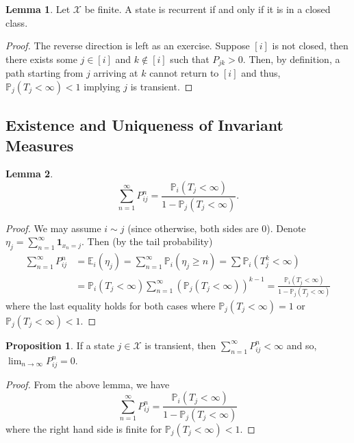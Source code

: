 \documentclass[]{article}
\theoremstyle{definition}
\theoremstyle{definition}
\newtheorem{lemma}{Lemma}[section]
\newtheorem{proposition}{Proposition}[section]
\begin{document}
\begin{lemma}
  Let \(\mathcal{X}\) be finite. A state is recurrent if and only if it is in a closed 
  class.
\end{lemma}
\begin{proof}
  The reverse direction is left as an exercise. Suppose \([i]\) is not closed, 
  then there exists some \(j \in [i]\) and \(k \not\in [i]\) such that \(P_{jk} > 0\).
  Then, by definition, a path starting from \(j\) arriving at \(k\) cannot return 
  to \([i]\) and thus, \(\mathbb{P}_j(T_j < \infty) < 1\) implying \(j\) is transient.
\end{proof}

\subsection{Existence and Uniqueness of Invariant Measures}

\begin{lemma}
  \[\sum_{n = 1}^\infty P^n_{ij} = \frac{\mathbb{P}_i(T_j < \infty)}{1 - \mathbb{P}_j(T_j < \infty)}.\]
\end{lemma}
\begin{proof}
  We may assume \(i \sim j\) (since otherwise, both sides are 0). Denote 
  \(\eta_j = \sum_{n = 1}^\infty \mathbf{1}_{x_n = j}\). Then (by the tail probability)
  \[\begin{split}
    \sum_{n = 1}^\infty P^n_{ij} & = \mathbb{E}_i(\eta_j) = \sum_{n = 1}^\infty \mathbb{P}_i(\eta_j \ge n)
      = \sum \mathbb{P}_i(T_j^k < \infty) \\
    & = \mathbb{P}_i(T_j < \infty) \sum_{n = 1}^\infty (\mathbb{P}_j(T_j < \infty))^{k - 1}
    = \frac{\mathbb{P}_i(T_j < \infty)}{1 - \mathbb{P}_j(T_j < \infty)}
  \end{split}\]
  where the last equality holds for both cases where \(\mathbb{P}_j(T_j < \infty) = 1\) 
  or \(\mathbb{P}_j(T_j < \infty) < 1\).
\end{proof}

\begin{proposition}
  If a state \(j \in \mathcal{X}\) is transient, then \(\sum_{n = 1}^\infty P^n_{ij} < \infty\)
  and so, \(\lim_{n \to \infty} P_{ij}^n = 0\).
\end{proposition}
\begin{proof}
  From the above lemma, we have 
  \[\sum_{n = 1}^\infty P^n_{ij} = \frac{\mathbb{P}_i(T_j < \infty)}{1 - \mathbb{P}_j(T_j < \infty)}\]
  where the right hand side is finite for \(\mathbb{P}_j(T_j < \infty) < 1\).
\end{proof}
\end{document}
